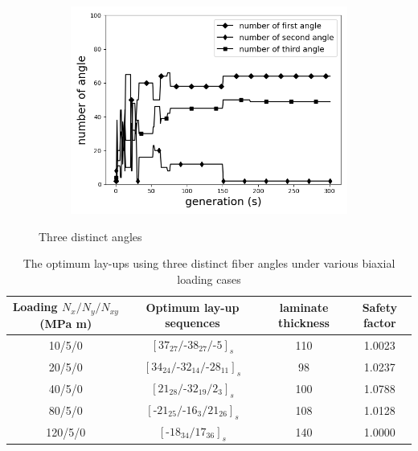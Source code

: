 \begin{figure}[!t]
		\begin{subfigure}[b]{0.8\linewidth}
			\includegraphics[width=\linewidth]{2020-11-10-pre-image/three_distinct_angle_number_of_angle.png}
		\end{subfigure}
	\caption{Three distinct angles}
	\label{fig:three_angles}
\end{figure}


\begin{table}
\normalsize
\caption{The optimum lay-ups using three distinct fiber angles under various biaxial loading cases}
\label{T300/5308 material properties}
\centering
\begin{tabular}{cccc}
	\toprule
	Loading	$N_{x}/N_{y}/N_{xy}$ (MPa m)	       & Optimum lay-up sequences                                   & laminate thickness &  Safety factor \\
	\midrule
	10/5/0                                         &  $[37_{27}/\text{-}38_{27}/\text{-}5]_s$                   &     110               &  1.0023 \\
	20/5/0                                         &  $[34_{24}/\text{-}32_{14}/\text{-}28_{11}]_s$             &     98               &  1.0237 \\
	40/5/0                                         &  $[21_{28}/\text{-}32_{19}/2_3]_s$                         &     100               &  1.0788 \\
	80/5/0                                         &  $[\text{-}21_{25}/\text{-}16_{3}/21_{26}]_s$              &     108               &  1.0128 \\
	120/5/0                                         &  $[\text{-}18_{34}/17_{36}]_s$                            &     140               &  1.0000 \\
	\bottomrule
\end{tabular}
\end{table}



